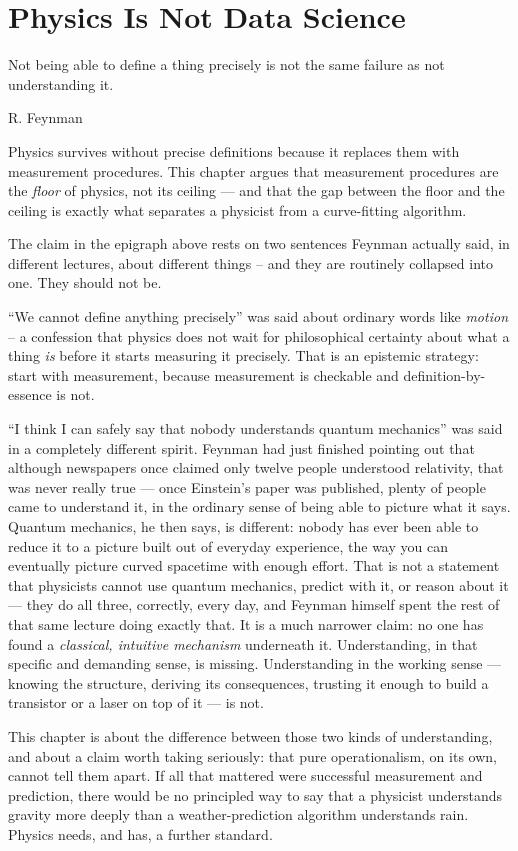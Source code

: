 \chapter{Physics Is Not Data Science}
\label{pd}

\epigraph{Not being able to define a thing precisely is not the same failure 
as not understanding it.}{ R. Feynman}
 Physics survives without precise definitions because it replaces them with
 measurement procedures. This chapter argues that measurement procedures are
 the \emph{floor} of physics, not its ceiling --- and that the gap between the
 floor and the ceiling is exactly what separates a physicist from a
 curve-fitting algorithm.

The claim in the epigraph above rests on two sentences Feynman actually said,
in different lectures, about different things -- and they are routinely
collapsed into one. They should not be.

``We cannot define anything precisely'' was said about ordinary words like
\emph{motion} -- a confession that physics does not wait for philosophical
certainty about what a thing \emph{is} before it starts measuring it precisely.
That is an epistemic strategy: start with measurement, because measurement is
checkable and definition-by-essence is not.

``I think I can safely say that nobody understands quantum mechanics'' was said
in a completely different spirit.  Feynman had just finished pointing out that
although newspapers once claimed only twelve people understood relativity, that
was never really true --- once Einstein's paper was published, plenty of people
came to understand it, in the ordinary sense of being able to picture what it
says. Quantum mechanics, he then says, is different: nobody has ever been able
to reduce it to a picture built out of everyday experience, the way you can
eventually picture curved spacetime with enough effort. That is not a statement
that physicists cannot use quantum mechanics, predict with it, or reason about
it --- they do all three, correctly, every day, and Feynman himself spent the
rest of that same lecture doing exactly that. It is a much narrower claim: no
one has found a \emph{classical, intuitive mechanism} underneath it.
Understanding, in that specific and demanding sense, is missing. Understanding
in the working sense --- knowing the structure, deriving its consequences,
trusting it enough to build a transistor or a laser on top of it --- is not.

This chapter is about the difference between those two kinds of understanding,
and about a claim worth taking seriously: that pure operationalism, on its own,
cannot tell them apart. If all that mattered were successful measurement and
prediction, there would be no principled way to say that a physicist
understands gravity more deeply than a weather-prediction algorithm understands
rain. Physics needs, and has, a further standard.


